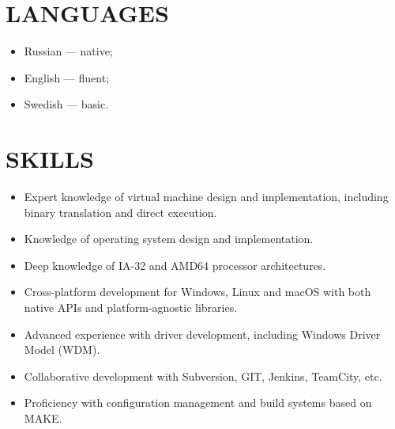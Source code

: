 ﻿\documentclass[12pt, a4paper, oneside]{article}
\begin{document}
\section*{LANGUAGES}

\begin{itemize}
\item Russian --- native;
\item English --- fluent;
\item Swedish --- basic.
\end{itemize}

\section*{SKILLS}

\begin{itemize}
\item Expert knowledge of virtual machine design and implementation,
  including binary translation and direct execution.
\item Knowledge of operating system design and implementation.
\item Deep knowledge of IA-32 and AMD64 processor architectures.
\item Cross-platform development for Windows, Linux and macOS with both native
  APIs and platform-agnostic libraries.
\item Advanced experience with driver development, including Windows Driver
  Model (WDM).
\item Collaborative development with Subversion, GIT, Jenkins, TeamCity, etc.
\item Proficiency with configuration management and build systems based on MAKE.
\end{itemize}

\nocite{dvcon-lzcnt}
\nocite{en-t-cet}
\printbibliography[title={PUBLICATIONS}]
\end{document}
